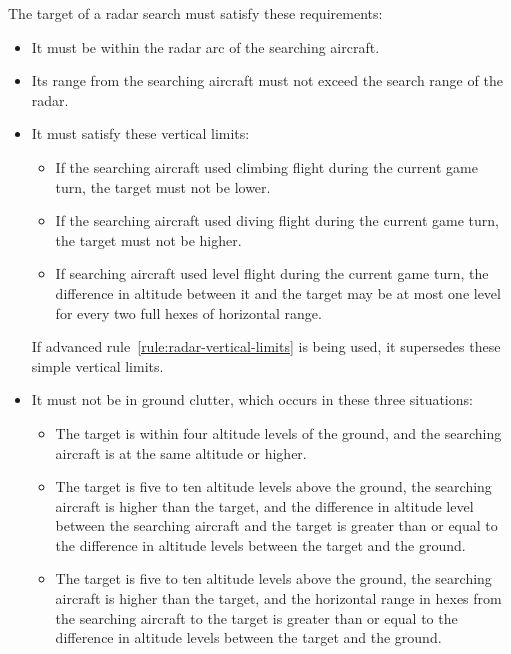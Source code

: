 {The target of a radar search must satisfy these requirements:

    \begin{itemize}

    \item It must be within the radar arc of the searching aircraft.

    \item Its range from the searching aircraft must not exceed the search range of the radar.

    \item It must satisfy these vertical limits:
    \begin{itemize}
        \item If the searching aircraft used climbing flight during the current game turn, the target must not be lower.
        \item If the searching aircraft used diving flight during the current game turn, the target must not be higher.
        \item If searching aircraft used level flight during the current game turn, the difference in altitude between it and the target may be at most one level for every two full hexes of horizontal range.
    \end{itemize}

    If advanced rule~\ref{rule:radar-vertical-limits} is being used, it supersedes these simple vertical limits.

    \item It must not be in ground clutter, which occurs in these three situations:

    \begin{itemize}
        \item The target is within four altitude levels of the ground, and the searching aircraft is at the same altitude or higher.
        \item The target is five to ten altitude levels above the ground, the searching aircraft is higher than the target, and the difference in altitude level between the searching aircraft and the target is greater than or equal to the difference in altitude levels between the target and the ground.
        \item The target is five to ten altitude levels above the ground, the searching aircraft is higher than the target, and the horizontal range in hexes from the searching aircraft to the target is greater than or equal to the difference in altitude levels between the target and the ground.
        

\end{itemize}
\end{itemize}}
